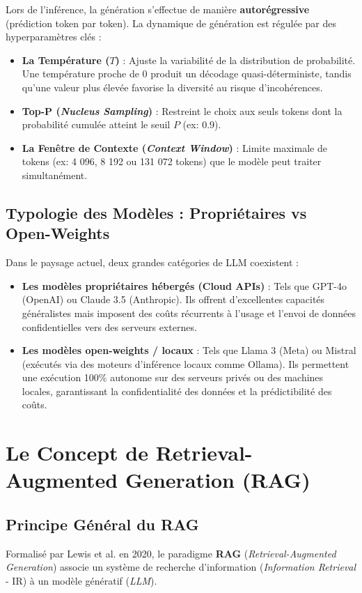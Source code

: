 Lors de l'inférence, la génération s'effectue de manière \textbf{autorégressive} (prédiction token par token). La dynamique de génération est régulée par des hyperparamètres clés :
\begin{itemize}
    \item \textbf{La Température ($T$)} : Ajuste la variabilité de la distribution de probabilité. Une température proche de 0 produit un décodage quasi-déterministe, tandis qu'une valeur plus élevée favorise la diversité au risque d'incohérences.
    \item \textbf{Top-P (\textit{Nucleus Sampling})} : Restreint le choix aux seuls tokens dont la probabilité cumulée atteint le seuil $P$ (ex: $0.9$).
    \item \textbf{La Fenêtre de Contexte (\textit{Context Window})} : Limite maximale de tokens (ex: 4 096, 8 192 ou 131 072 tokens) que le modèle peut traiter simultanément.
\end{itemize}

\subsection{Typologie des Modèles : Propriétaires vs Open-Weights}
Dans le paysage actuel, deux grandes catégories de LLM coexistent :
\begin{itemize}
    \item \textbf{Les modèles propriétaires hébergés (Cloud APIs)} : Tels que GPT-4o (OpenAI) ou Claude 3.5 (Anthropic). Ils offrent d'excellentes capacités généralistes mais imposent des coûts récurrents à l'usage et l'envoi de données confidentielles vers des serveurs externes.
    \item \textbf{Les modèles open-weights / locaux} : Tels que Llama 3 (Meta) ou Mistral (exécutés via des moteurs d'inférence locaux comme Ollama). Ils permettent une exécution 100\% autonome sur des serveurs privés ou des machines locales, garantissant la confidentialité des données et la prédictibilité des coûts.
\end{itemize}

\section{Le Concept de Retrieval-Augmented Generation (RAG)}

\subsection{Principe Général du RAG}
Formalisé par Lewis et al. en 2020, le paradigme \textbf{RAG} (\textit{Retrieval-Augmented Generation}) associe un système de recherche d'information (\textit{Information Retrieval} - IR) à un modèle génératif (\textit{LLM}).

